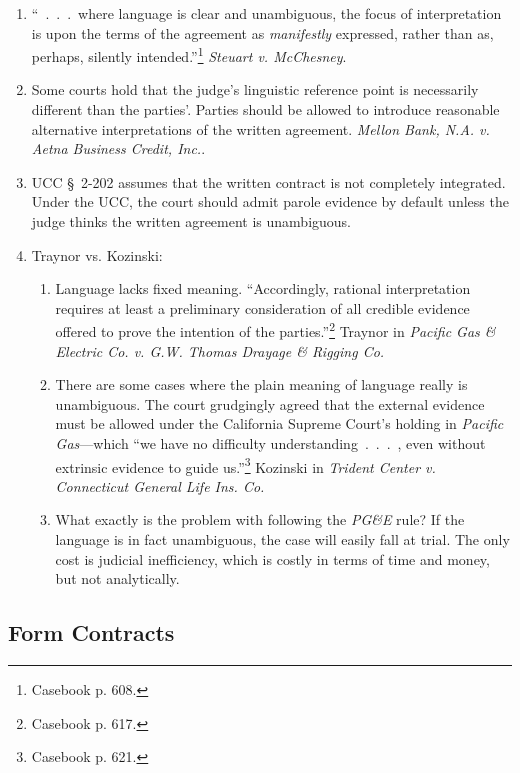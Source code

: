 \begin{enumerate}
    \item ``~.~.~.~where language is clear and unambiguous, the focus of 
    interpretation is upon the terms of the agreement as \emph{manifestly} 
    expressed, rather than as, perhaps, silently intended.''\footnote{Casebook 
    p. 608.} \emph{Steuart v. McChesney}.
    \item Some courts hold that the judge's linguistic reference point is 
    necessarily different than the parties'. Parties should be allowed to 
    introduce reasonable alternative interpretations of the written agreement. 
    \emph{Mellon Bank, N.A. v. Aetna Business Credit, Inc.}.
    \item UCC \S\ 2-202 assumes that the written contract is not completely 
    integrated. Under the UCC, the court should admit parole evidence by 
    default unless the judge thinks the written agreement is unambiguous.
    \item Traynor vs. Kozinski:
    \begin{enumerate}
        \item Language lacks fixed meaning. ``Accordingly, rational 
        interpretation requires at least a preliminary consideration of all 
        credible evidence offered to prove the intention of the 
        parties.''\footnote{Casebook p. 617.} Traynor in \emph{Pacific Gas \& 
        Electric Co. v. G.W. Thomas Drayage \& Rigging Co.}
        \item There are some cases where the plain meaning of language really 
        is unambiguous. The court grudgingly agreed that the external evidence 
        must be allowed under the California Supreme Court's holding in 
        \emph{Pacific Gas}---which ``we have no difficulty 
        understanding~.~.~.~, even without extrinsic evidence to guide 
        us.''\footnote{Casebook p. 621.} Kozinski in \emph{Trident Center v. 
        Connecticut General Life Ins. Co.}
        \item What exactly is the problem with following the \emph{PG\&E} 
        rule? If the language is in fact unambiguous, the case will easily 
        fall at trial. The only cost is judicial inefficiency, which is costly 
        in terms of time and money, but not analytically.
    \end{enumerate}
\end{enumerate} 

\subsection{Form Contracts}

